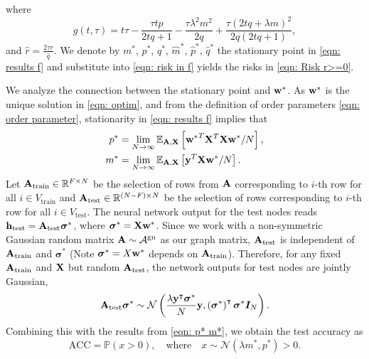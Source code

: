 \documentclass[9pt,twocolumn]{pnas-new}
\begin{document}
where
\begin{equation*}
g(t,\tau)=t \tau -\frac{\tau t p}{2 t q+1}-\frac{ \tau \lambda^2 m^2}{2 q}+\frac{ \tau \left(2 t q+\lambda m\right)^{2}}{2q\left(2 t  q+1\right)},
\end{equation*} and
$\widehat{r}=\frac{2 \tau r}{ \widehat{q}}$.
We denote by $m^*$, $p^*$, $q^*$, $\widehat{m}^*$, $\widehat{p}^*$, $\widehat{q}^*$ the stationary point in \eqref{eqn: results f} and substitute into \eqref{eqn: risk in f} yields the risks in \ref{eqn: Risk r>=0}.

We analyze the connection between the stationary point and $\mathbf{w}^*$. 
As $\mathbf{w}^*$ is the unique solution in \eqref{eqn: optim}, and from the definition of order parameters \eqref{eqn: order parameter}, stationarity in \eqref{eqn: results f} implies that
\begin{equation}\label{eqn: p* m*}
    \begin{aligned}
    p^*&=\lim_{N\to\infty} \mathbb{E}_{\mathbf{A},\mathbf{X}} \left[{\mathbf{w}^*}^T \mathbf{X}^T \mathbf{X} \mathbf{w}^*/N\right],\\
    m^*&=\lim_{N\to\infty} \mathbb{E}_{\mathbf{A},\mathbf{X}} \left[\mathbf{y}^T \mathbf{X}\mathbf{w}^*/N\right].
    \end{aligned}
\end{equation}
Let $\mathbf{A}_{\text{train}}\in \mathbb{R}^{F\times N}$ be the selection of rows from $\mathbf{A}$ corresponding to $i$-th row for all $i \in V_\text{train}$ and $\mathbf{A}_{\text{test}}\in \mathbb{R}^{(N-F)\times N}$ be the selection of rows  corresponding to $i$-th row for all $i \in V_\text{test}$. The neural network output for the test nodes reads $\mathbf{h}_{\text{test}} = \mathbf{A}_{\text{test}}\boldsymbol{\sigma}^*$, where $\boldsymbol{\sigma}^* = \mathbf{X}\mathbf{w}^*$.  Since we work with a non-symmetric Gaussian random matrix $\mathbf{A} \sim \mathcal{A}^{\text{gn}}$ as our graph matrix, $\mathbf{A}_\text{test}$ is independent of $\mathbf{A}_\text{train}$ and $\boldsymbol{\sigma}^*$ (Note $\boldsymbol{\sigma}^*=X\mathbf{w}^*$ depends on $\mathbf{A}_\text{train}$). Therefore, for any fixed $\mathbf{A}_{\text{train}}$ and $\mathbf{X}$ but random $\mathbf{A}_{\text{test}}$, the network outputs for test nodes are jointly Gaussian,
\begin{equation*}
    \mathbf{A}_{\text{test}}\boldsymbol{\sigma}^* \sim \mathcal{N}\left({\frac{\lambda \mathbf{y}^\intercal \boldsymbol{\sigma}^*}{ N}\mathbf{y}, \left(\boldsymbol{\sigma}^*\right)^\intercal     \boldsymbol{\sigma}^* \boldsymbol{I}_N}\right).
\end{equation*}
Combining this with the results from \eqref{eqn: p* m*}, we obtain the test accuracy as
\begin{equation}
    \mathrm{ACC}=\mathbb{P}(x>0 ), \quad \text{where} \quad  x\sim \mathcal{N}\left(\lambda m^*, p^*\right)>0.
\end{equation}
\end{document}

